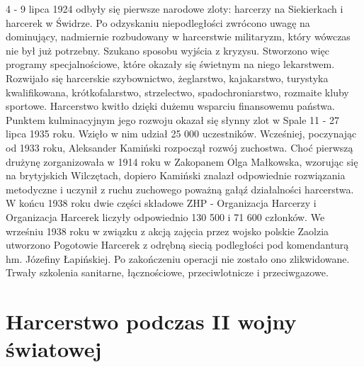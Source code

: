 4 - 9 lipca 1924 odbyły się pierwsze narodowe zloty: harcerzy na Siekierkach i harcerek w Świdrze. Po odzyskaniu niepodległości zwrócono uwagę na dominujący, nadmiernie rozbudowany w harcerstwie militaryzm, który wówczas nie był już potrzebny. Szukano sposobu wyjścia z kryzysu. Stworzono więc programy specjalnościowe, które okazały się świetnym na niego lekarstwem. Rozwijało się harcerskie szybownictwo, żeglarstwo, kajakarstwo, turystyka kwalifikowana, krótkofalarstwo, strzelectwo, spadochroniarstwo, rozmaite kluby sportowe. Harcerstwo kwitło dzięki dużemu wsparciu finansowemu państwa. Punktem kulminacyjnym jego rozwoju okazał się słynny zlot w Spale 11 - 27 lipca 1935 roku. Wzięło w nim udział 25 000 uczestników. Wcześniej, poczynając od 1933 roku, Aleksander Kamiński rozpoczął rozwój zuchostwa. Choć pierwszą drużynę zorganizowała w 1914 roku w Zakopanem Olga Małkowska, wzorując się na brytyjskich Wilczętach, dopiero Kamiński znalazł odpowiednie rozwiązania metodyczne i uczynił z ruchu zuchowego poważną gałąź działalności harcerstwa. W końcu 1938 roku dwie części składowe ZHP - Organizacja Harcerzy i Organizacja Harcerek liczyły odpowiednio 130 500 i 71 600 członków. We wrześniu 1938 roku w związku z akcją zajęcia przez wojsko polskie Zaolzia utworzono Pogotowie Harcerek z odrębną siecią podległości pod komendanturą hm. Józefiny Łapińskiej. Po zakończeniu operacji nie zostało ono zlikwidowane. Trwały szkolenia sanitarne, łącznościowe, przeciwlotnicze i przeciwgazowe.

\section{Harcerstwo podczas II wojny światowej}

